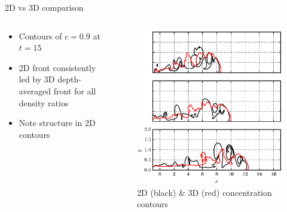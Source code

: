 \documentclass[presentation]{beamer}
\begin{document}
\begin{frame}[label={sec:orgddeb3a6}]{2D vs 3D comparison}
\begin{columns}
\begin{column}{0.5\columnwidth}
\begin{itemize}
\item Contours of \(c=0.9\) at \(t=15\)
\item 2D front consistently led by 3D depth-averaged front for all density ratios
\item Note structure in 2D contours
\end{itemize}
\end{column}

\begin{column}{0.5\columnwidth}
\begin{figure}[htbp]
\centering
\includegraphics[width=0.9\columnwidth]{./figures/c09-2d3d-t15.eps}
\caption{2D (black) \& 3D (red) concentration contours}
\end{figure}
\end{column}
\end{columns}
\end{frame}
\end{document}
